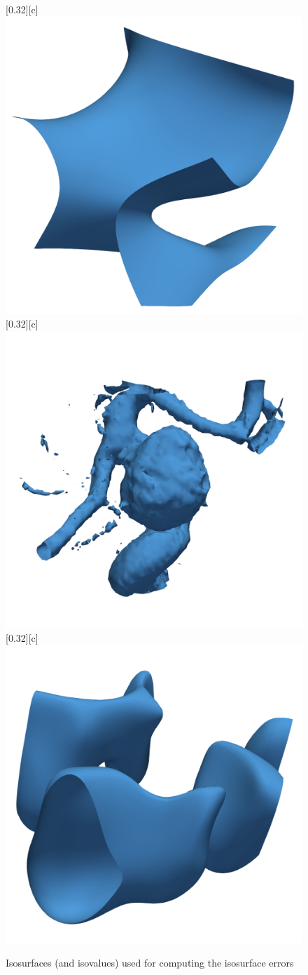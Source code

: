 \documentclass{article}
\begin{document}
\begin{figure}[htb]
        [0.32\linewidth][c]{%
                \includegraphics[width=0.22\linewidth]{img/supplementary/karfs-iso.png}}
        [0.32\linewidth][c]{%
                \includegraphics[width=0.22\linewidth]{img/supplementary/aneurism-iso.png}}
        [0.32\linewidth][c]{%
                \includegraphics[width=0.22\linewidth]{img/supplementary/velocityz-iso.png}}
        \caption{Isosurfaces (and isovalues) used for computing the isosurface errors}
\end{figure}
\end{document}
